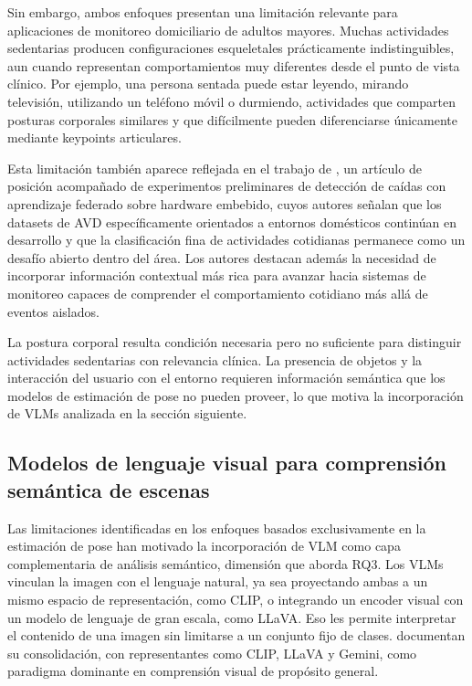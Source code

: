 Sin embargo, ambos enfoques presentan una limitación relevante para aplicaciones de monitoreo domiciliario de adultos mayores.
Muchas actividades sedentarias producen configuraciones esqueletales prácticamente indistinguibles, aun cuando representan comportamientos muy diferentes desde el punto de vista clínico.
Por ejemplo, una persona sentada puede estar leyendo, mirando televisión, utilizando un teléfono móvil o durmiendo, actividades que comparten posturas corporales similares y que difícilmente pueden diferenciarse únicamente mediante keypoints articulares.

Esta limitación también aparece reflejada en el trabajo de \textcite{Shao2025}, un artículo de posición acompañado de experimentos preliminares de detección de caídas con aprendizaje federado sobre hardware embebido, cuyos autores señalan que los datasets de AVD específicamente orientados a entornos domésticos continúan en desarrollo y que la clasificación fina de actividades cotidianas permanece como un desafío abierto dentro del área.
Los autores destacan además la necesidad de incorporar información contextual más rica para avanzar hacia sistemas de monitoreo capaces de comprender el comportamiento cotidiano más allá de eventos aislados.

La postura corporal resulta condición necesaria pero no suficiente para distinguir actividades sedentarias con relevancia clínica.
La presencia de objetos y la interacción del usuario con el entorno requieren información semántica que los modelos de estimación de pose no pueden proveer, lo que motiva la incorporación de VLMs analizada en la sección siguiente.

\subsection{Modelos de lenguaje visual para comprensión semántica de escenas}
\label{sec:vlm}

Las limitaciones identificadas en los enfoques basados exclusivamente en la estimación de pose han motivado la incorporación de VLM como capa complementaria de análisis semántico, dimensión que aborda RQ3.
Los VLMs vinculan la imagen con el lenguaje natural, ya sea proyectando ambas a un mismo espacio de representación, como CLIP, o integrando un encoder visual con un modelo de lenguaje de gran escala, como LLaVA.
Eso les permite interpretar el contenido de una imagen sin limitarse a un conjunto fijo de clases.
\textcite{Zhang2024vlmsurvey} documentan su consolidación, con representantes como CLIP, LLaVA y Gemini, como paradigma dominante en comprensión visual de propósito general.

